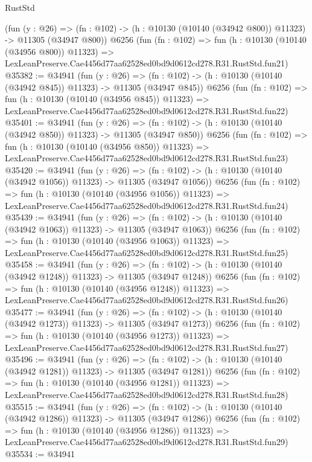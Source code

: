 \begin{lexlean}{RustStd}
\begin{coremodule}
    (fun (y : @26) =>
    (fn : @102) -> (h : @10130 (@10140 (@34942 @800)) @11323) -> @11305 (@34947 @800))
    @6256
    (fun (fn : @102) =>
    fun (h : @10130 (@10140 (@34956 @800)) @11323) =>
    LexLeanPreserve.Cae4456d77aa62528ed0bd9d0612cd278.R31.RustStd.fun21)
@35382 := @34941
    (fun (y : @26) =>
    (fn : @102) -> (h : @10130 (@10140 (@34942 @845)) @11323) -> @11305 (@34947 @845))
    @6256
    (fun (fn : @102) =>
    fun (h : @10130 (@10140 (@34956 @845)) @11323) =>
    LexLeanPreserve.Cae4456d77aa62528ed0bd9d0612cd278.R31.RustStd.fun22)
@35401 := @34941
    (fun (y : @26) =>
    (fn : @102) -> (h : @10130 (@10140 (@34942 @850)) @11323) -> @11305 (@34947 @850))
    @6256
    (fun (fn : @102) =>
    fun (h : @10130 (@10140 (@34956 @850)) @11323) =>
    LexLeanPreserve.Cae4456d77aa62528ed0bd9d0612cd278.R31.RustStd.fun23)
@35420 := @34941
    (fun (y : @26) =>
    (fn : @102) -> (h : @10130 (@10140 (@34942 @1056)) @11323) -> @11305 (@34947 @1056))
    @6256
    (fun (fn : @102) =>
    fun (h : @10130 (@10140 (@34956 @1056)) @11323) =>
    LexLeanPreserve.Cae4456d77aa62528ed0bd9d0612cd278.R31.RustStd.fun24)
@35439 := @34941
    (fun (y : @26) =>
    (fn : @102) -> (h : @10130 (@10140 (@34942 @1063)) @11323) -> @11305 (@34947 @1063))
    @6256
    (fun (fn : @102) =>
    fun (h : @10130 (@10140 (@34956 @1063)) @11323) =>
    LexLeanPreserve.Cae4456d77aa62528ed0bd9d0612cd278.R31.RustStd.fun25)
@35458 := @34941
    (fun (y : @26) =>
    (fn : @102) -> (h : @10130 (@10140 (@34942 @1248)) @11323) -> @11305 (@34947 @1248))
    @6256
    (fun (fn : @102) =>
    fun (h : @10130 (@10140 (@34956 @1248)) @11323) =>
    LexLeanPreserve.Cae4456d77aa62528ed0bd9d0612cd278.R31.RustStd.fun26)
@35477 := @34941
    (fun (y : @26) =>
    (fn : @102) -> (h : @10130 (@10140 (@34942 @1273)) @11323) -> @11305 (@34947 @1273))
    @6256
    (fun (fn : @102) =>
    fun (h : @10130 (@10140 (@34956 @1273)) @11323) =>
    LexLeanPreserve.Cae4456d77aa62528ed0bd9d0612cd278.R31.RustStd.fun27)
@35496 := @34941
    (fun (y : @26) =>
    (fn : @102) -> (h : @10130 (@10140 (@34942 @1281)) @11323) -> @11305 (@34947 @1281))
    @6256
    (fun (fn : @102) =>
    fun (h : @10130 (@10140 (@34956 @1281)) @11323) =>
    LexLeanPreserve.Cae4456d77aa62528ed0bd9d0612cd278.R31.RustStd.fun28)
@35515 := @34941
    (fun (y : @26) =>
    (fn : @102) -> (h : @10130 (@10140 (@34942 @1286)) @11323) -> @11305 (@34947 @1286))
    @6256
    (fun (fn : @102) =>
    fun (h : @10130 (@10140 (@34956 @1286)) @11323) =>
    LexLeanPreserve.Cae4456d77aa62528ed0bd9d0612cd278.R31.RustStd.fun29)
@35534 := @34941

\end{coremodule}
\end{lexlean}
